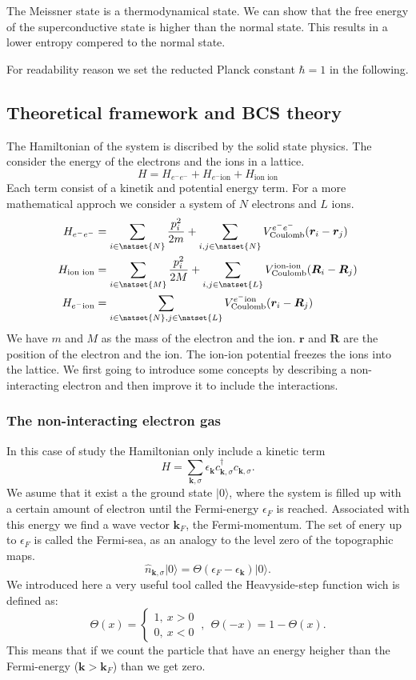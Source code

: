 \documentclass[../main.tex]{subfile}
\begin{document}
The Meissner state is a thermodynamical state. We can show that the free energy of the superconductive state is higher than the normal state. 
This results in a lower entropy compered to the normal state.

For readability reason we set the reducted Planck constant $\hbar = 1$ in the following.\\
\subsection{Theoretical framework and BCS theory}
The Hamiltonian of the system is discribed by the solid state physics. The consider the energy of the electrons and the ions in a lattice.
\[
    H = H_{e^-e^-} + H_{e^-\text{ion}} + H_{\text{ion ion}}
\]
Each term consist of a kinetik and potential energy term. For a more mathematical approch we consider a system of $N$ electrons and $L$ ions.
\begin{align*}
    H_{e^-e^-} &= \sum_{i \in \natset{N}} \frac{p_i^2}{2m} + \sum_{i,j\in\natset{N}} V_{\text{Coulomb}}^{e^-e^-}(\bm{r}_i-\bm{r}_j) \\
    H_{\text{ion ion}} &=  \sum_{i \in \natset{M}} \frac{p_i^2}{2M} + \sum_{i,j\in\natset{L}} V_{\text{Coulomb}}^{\text{ion-ion}}(\bm{R}_i-\bm{R}_j) \\
    H_{e^-\text{ion}} &= \sum_{i\in \natset{N},j\in \natset{L}} V_{\text{Coulomb}}^{e^-\text{ion}}(\bm{r}_i-\bm{R}_j)
\end{align*}
We have $m$ and $M$ as the mass of the electron and the ion. $\bm{r}$ and $\bm{R}$ are the position of the electron and the ion. The ion-ion potential
freezes the ions into the lattice. 
We first going to introduce some concepts by describing a non-interacting electron and then improve it to include the interactions.
\subsubsection{The non-interacting electron gas}
In this case of study the Hamiltonian only include a kinetic term
\[
    H=\sum_{\bm{k},\sigma} \epsilon_{\bm{k}} c_{\bm{k},\sigma}^{\dagger}c_{\bm{k},\sigma}.
\] 
We asume that it exist a the ground state $|0\rangle$, where the system is filled up with a certain amount of electron until the Fermi-energy $\epsilon_F$ is reached. Associated with this
energy we find a wave vector $\bm{k}_F$, the Fermi-momentum. The set of enery up to $\epsilon_F$ is called the Fermi-sea, as an analogy to the level zero of the topographic maps.
\[
    \hat{n}_{\bm{k},\sigma} |0\rangle = \Theta(\epsilon_F - \epsilon_{\bm{k}})|0\rangle.
\]
We introduced here a very useful tool called the Heavyside-step function wich is defined as: 
\[
    \Theta(x) = \begin{cases}
        1, ~x > 0\\
        0, ~x < 0
    \end{cases} ~ , ~~ \Theta(-x) = 1 - \Theta(x).
\] 
This means that if we count the particle that have an energy heigher than the Fermi-energy ($\bm{k}>\bm{k}_F$) than we get zero.\\
\end{document}
